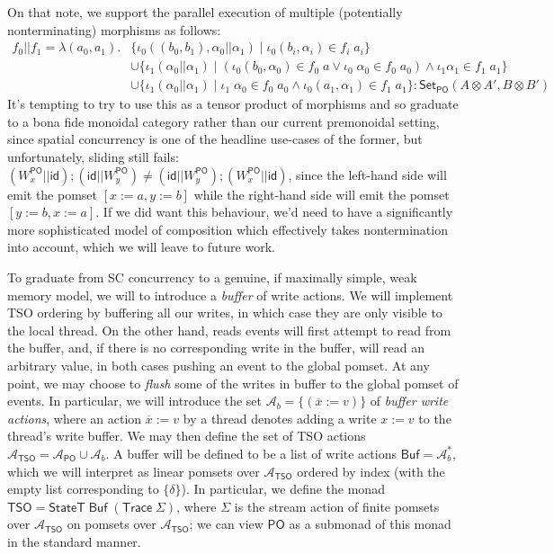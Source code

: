 \documentclass[acmsmall,screen,review]{acmart}
\newcommand{\mc}[1]{\ensuremath{\mathcal{#1}}}
\newcommand{\ms}[1]{\ensuremath{\mathsf{#1}}}
\newcommand{\bufloc}[1]{\overline{#1}}
\begin{document}
On that note, we support the parallel execution of multiple (potentially
nonterminating) morphisms as follows:
\begin{equation}
  \begin{aligned}
  f_0 || f_1 = \lambda (a_0, a_1). 
  & \{\iota_0 ((b_0, b_1), \alpha_0 || \alpha_1) 
    \mid \iota_0 (b_i, \alpha_i) \in f_i\;a_i\} 
  \\ & \cup \{\iota_1 (\alpha_0 || \alpha_1) \mid (\iota_0 (b_0, \alpha_0) \in f_0\;a \lor \iota_0\;\alpha_0 \in f_0\;a_0) \land \iota_1 \alpha_1 \in f_1\;a_1\} 
  \\ & \cup \{\iota_1 (\alpha_0 || \alpha_1) \mid \iota_1\;\alpha_0 \in f_0\;a_0 \land \iota_0 (a_1, \alpha_1) \in f_1\;a_1\}: \ms{Set}_{\ms{PO}}(A \otimes A', B \otimes B')
  \end{aligned}
\end{equation}
It's tempting to try to use this as a tensor product of morphisms and so
graduate to a bona fide monoidal category rather than our current premonoidal
setting, since spatial concurrency is one of the headline use-cases of the
former, but unfortunately, sliding still fails:
\(
  (W_x^{\ms{PO}} || \ms{id}) ; (\ms{id} || W_y^{\ms{PO}})
  \neq (\ms{id} || W_y^{\ms{PO}}) ; (W_x^{\ms{PO}} || \ms{id})
\),
since the left-hand side will emit the pomset \([x := a, y := b]\) while the
right-hand side will emit the pomset \([y := b, x := a]\). If we did want this
behaviour, we'd need to have a significantly more sophisticated model of
composition which effectively takes nontermination into account, which we will
leave to future work.

To graduate from SC concurrency to a genuine, if maximally simple, weak memory
model, we will to introduce a \textit{buffer} of write actions. We will
implement TSO ordering by buffering all our writes, in which case they are only
visible to the local thread. On the other hand, reads events will first attempt
to read from the buffer, and, if there is no corresponding write in the buffer,
will read an arbitrary value, in both cases pushing an event to the global
pomset. At any point, we may choose to \textit{flush} some of the writes in
buffer to the global pomset of events. In particular, we will introduce the set
\(\mc{A}_b = \{(\bufloc{x} := v)\}\) of \textit{buffer write actions}, where an
action \(\bufloc{x} := v\) by a thread denotes adding a write \(x := v\) to the
thread's write buffer. We may then define the set of TSO actions
\(\mc{A}_{\ms{TSO}} = \mc{A}_{\ms{PO}} \cup \mc{A}_b\). A buffer will be defined
to be a list of write actions \(\ms{Buf} = \mc{A}_b^*\), which we will interpret
as linear pomsets over \(\mc{A}_{\ms{TSO}}\) ordered by index (with the empty list corresponding to \(\{\delta\}\)). In particular, we
define the monad \(\ms{TSO} = \ms{StateT}\;\ms{Buf}\;(\ms{Trace}\;\Sigma)\),
where \(\Sigma\) is the stream action of finite pomsets over
\(\mc{A}_{\ms{TSO}}\) on pomsets over \(\mc{A}_{\ms{TSO}}\); we can view
\(\ms{PO}\) as a submonad of this monad in the standard manner.
\end{document}
